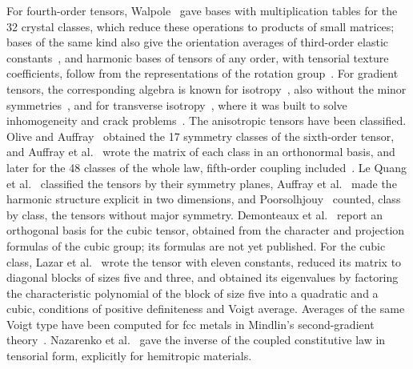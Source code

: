 For fourth-order tensors, Walpole~\cite{Walpole1984} gave bases with multiplication tables
for the 32 crystal classes, which reduce these operations to products of small matrices;
bases of the same kind also give the orientation averages of third-order elastic
constants~\cite{Kube2026}, and harmonic bases of tensors of any order, with tensorial
texture coefficients, follow from the representations of the rotation
group~\cite{Krause2025}. For gradient tensors, the corresponding algebra is known for
isotropy~\cite{Monchiet2011a,Auffray2015}, also without the minor
symmetries~\cite{Monchiet2011b}, and for transverse isotropy~\cite{Monchiet2013}, where
it was built to solve inhomogeneity and crack problems~\cite{Monchiet2015}. The anisotropic tensors have been classified. Olive and Auffray~\cite{Olive2013}
obtained the 17 symmetry classes of the sixth-order tensor, and Auffray et
al.~\cite{Auffray2013} wrote the matrix of each class in an orthonormal basis, and later
for the 48 classes of the whole law, fifth-order coupling included~\cite{Auffray2019}. Le Quang
et al.~\cite{LeQuang2021} classified the tensors by their symmetry planes, Auffray et
al.~\cite{Auffray2021} made the harmonic structure explicit in two dimensions, and
Poorsolhjouy~\cite[table~B.2]{Poorsolhjouy2026} counted, class by class, the tensors
without major symmetry. Demonteaux et al.~\cite{Demonteaux2025} report an orthogonal basis for the cubic
tensor, obtained from the character and projection formulas of the cubic group; its
formulas are not yet published. For the cubic class, Lazar et al.~\cite{Lazar2022} wrote
the tensor with eleven constants, reduced its matrix to diagonal blocks of sizes five and
three, and obtained its eigenvalues by factoring the characteristic polynomial of the
block of size five into a quadratic and a cubic, conditions of positive definiteness and Voigt
average. Averages of the same Voigt type have been computed for fcc metals in Mindlin's
second-gradient theory~\cite{Bagherpour2024a,Bagherpour2024b}. Nazarenko et
al.~\cite{Nazarenko2021a} gave the inverse of the coupled constitutive law in tensorial
form, explicitly for hemitropic materials.

